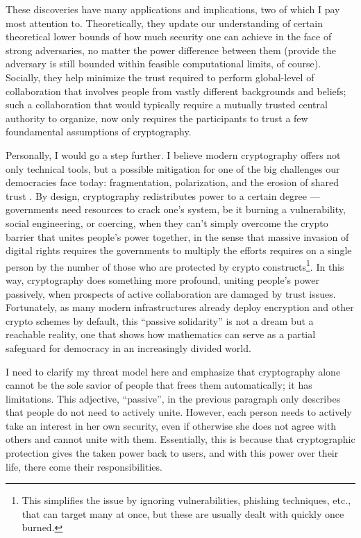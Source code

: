 \documentclass[10pt]{article}
\begin{document}
These discoveries have many applications and implications, two of which I pay
most attention to. Theoretically, they update our understanding of certain
theoretical lower bounds of how much security one can achieve in the face of
strong adversaries, no matter the power difference between them (provide the
adversary is still bounded within feasible computational limits, of course).
Socially, they help minimize the trust required to perform global-level
of collaboration that involves people from vastly different backgrounds and
beliefs; such a collaboration that would typically require a mutually trusted
central authority to organize, now only requires the participants to trust a
few foundamental assumptions of cryptography.

Personally, I would go a step further. I believe modern cryptography offers not
only technical tools, but a possible mitigation for one of the big
challenges our democracies face today: fragmentation, polarization, and the
erosion of shared trust \cite{trust.book.fukuyama, how.democracies.die,
cultural.backlash}. By
design, cryptography redistributes power to a certain degree --- governments
need resources to crack one's system, be it burning a vulnerability, social
engineering, or coercing, when they can't simply overcome the crypto barrier
that unites people's power together, in the sense that massive
invasion of digital rights requires the governments to multiply the efforts
requires on a single person by the number of those who are protected by crypto
constructs\footnote{This simplifies the issue by ignoring vulnerabilities,
phishing techniques, etc., that can target many at once, but these are usually
dealt with quickly once burned.}. In this way, cryptography does something more
profound, uniting people's power passively, when prospects of active
collaboration are damaged by trust issues.  Fortunately, as many modern
infrastructures already deploy encryption and other crypto schemes by default,
this ``passive solidarity'' is not a dream but a reachable reality, one that
shows how mathematics can serve as a partial safeguard for democracy in an
increasingly divided world.

I need to clarify my threat model here and emphasize that cryptography alone
cannot be the sole savior of people that frees them automatically; it has
limitations. This adjective, ``passive'', in the previous paragraph only
describes that people do not need to actively unite.  However, each person
needs to actively take an interest in her own security, even if otherwise she
does not agree with others and cannot unite with them. Essentially, this is
because that cryptographic protection gives the taken power back to users, and
with this power over their life, there come their responsibilities.
\end{document}
